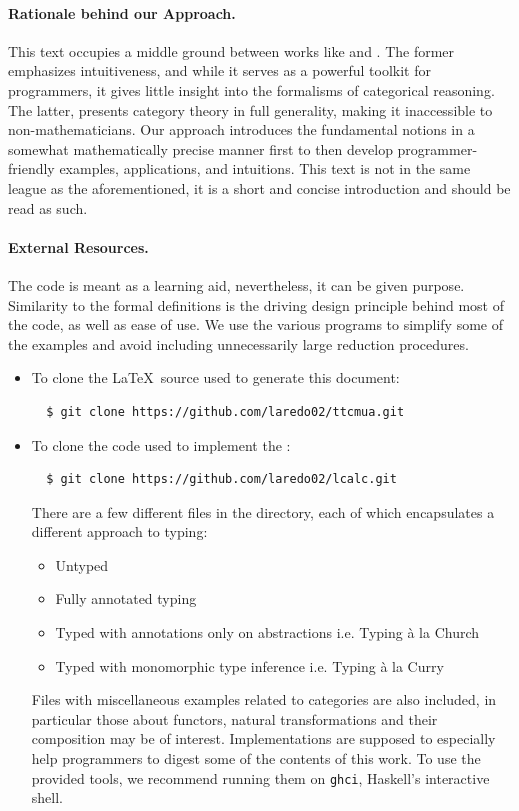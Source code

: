 \paragraph{Rationale behind our Approach.}{
  This text occupies a middle ground between works like \cite{Milewski2019} and \cite{maclane1971categories}. The former emphasizes intuitiveness, and while it serves as a powerful toolkit for programmers, it gives little insight into the formalisms of categorical reasoning. The latter, presents category theory in full generality, making it inaccessible to non-mathematicians. Our approach introduces the fundamental notions in a somewhat mathematically precise manner first to then develop programmer-friendly examples, applications, and intuitions. This text is not in the same league as the aforementioned, it is a short and concise introduction and should be read as such.
}

\paragraph{External Resources.}
{
The code is meant as a learning aid, nevertheless, it can be given purpose. Similarity to the formal definitions is the driving design principle behind most of the code, as well as ease of use. We use the various programs to simplify some of the examples and avoid including unnecessarily large reduction procedures.
\begin{itemize}
  
\item To clone the \LaTeX \ source used to generate this document:
\begin{verbatim}
  $ git clone https://github.com/laredo02/ttcmua.git
\end{verbatim}

\item To clone the code used to implement the \lcalc:
\begin{verbatim}
  $ git clone https://github.com/laredo02/lcalc.git
\end{verbatim}

There are a few different files in the directory, each of which encapsulates a different approach to typing:
\begin{itemize}
\item Untyped
\item Fully annotated typing
\item Typed with annotations only on abstractions i.e. Typing à la Church
\item Typed with monomorphic type inference i.e. Typing à la Curry
\end{itemize}
Files with miscellaneous examples related to categories are also included, in particular those about functors, natural transformations and their composition may be of interest. Implementations are supposed to especially help programmers to digest some of the contents of this work. To use the provided tools, we recommend running them on \texttt{ghci}, Haskell's interactive shell.

\end{itemize}
}

